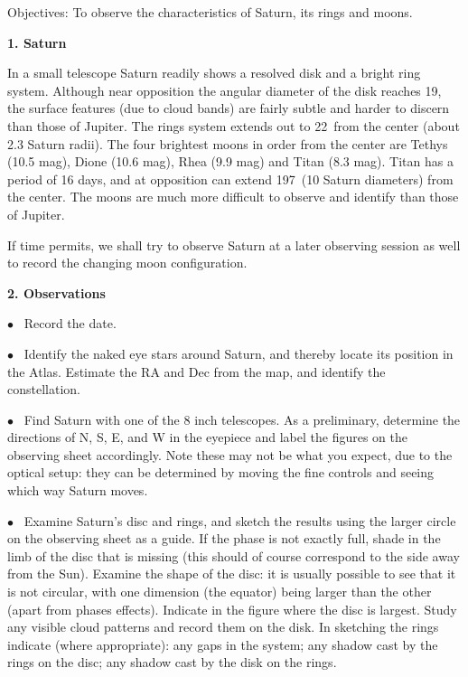 
\noindent
{Objectives:} To observe the characteristics of Saturn, its rings and
moons.

\bigskip\noindent

\bigskip
\noindent
{\bf 1. Saturn }

\medskip
\noindent
In a small telescope Saturn readily shows a resolved disk and a bright
ring system. Although near opposition the angular diameter of the disk
reaches 19\arcsec, the surface features (due to cloud bands) are
fairly subtle and harder to discern than those of Jupiter. The rings
system extends out to 22\arcsec\  from the center (about 2.3 Saturn
radii). The four brightest moons in order from the center are Tethys
(10.5 mag), Dione (10.6 mag), Rhea (9.9 mag) and Titan (8.3
mag). Titan has a period of 16 days, and at opposition can extend
197\arcsec\ (10 Saturn diameters) from the center. The moons are much
more difficult to observe and identify than those of Jupiter.
 
If time permits, we shall try to observe Saturn at a later observing
session as well to record the changing moon configuration.

\bigskip
\noindent
{\bf 2. Observations}

\medskip
\noindent

\noindent $\bullet$ \ 
Record the date.

\medskip
\noindent $\bullet$ \ 
 Identify the naked eye stars around Saturn, and thereby locate its 
position in the Atlas. Estimate the RA and Dec from the map,
and identify the constellation.

\medskip
\noindent $\bullet$ \  
 Find Saturn  with one of the 8 inch telescopes.
As a preliminary, determine the directions of N, S, E, and W
in the eyepiece and label the figures on the observing sheet
accordingly. Note these may not be what you expect, due to the
optical setup: they can be determined by moving the fine controls and
seeing which way Saturn moves.

\medskip
\noindent $\bullet$ \ 
Examine Saturn's disc and rings, and sketch the results using the
larger circle on the observing sheet as a guide. If the phase is not exactly
full, shade in the limb of the disc that is missing (this should of
course correspond to the side away from the Sun).  Examine the
shape of the disc: it is usually possible to see that it is not
circular, with one dimension (the equator) being larger than the other
(apart from phases effects). Indicate in the figure where the disc is
largest.  Study any visible cloud patterns and record them on the
disk.  In sketching the rings indicate (where appropriate): any gaps
in the system; any shadow cast by the rings on the disc; any
shadow cast by the disk on the rings.

